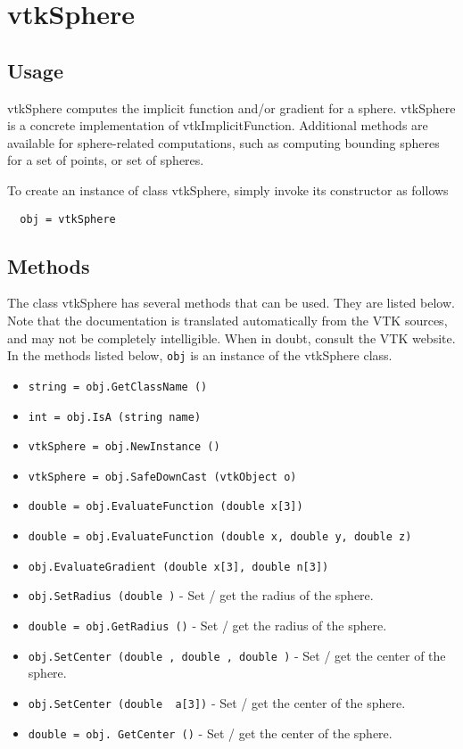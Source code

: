 \section{vtkSphere}

\subsection{Usage}

 vtkSphere computes the implicit function and/or gradient for a sphere.
 vtkSphere is a concrete implementation of vtkImplicitFunction. Additional
 methods are available for sphere-related computations, such as computing
 bounding spheres for a set of points, or set of spheres.

To create an instance of class vtkSphere, simply
invoke its constructor as follows
\begin{verbatim}
  obj = vtkSphere
\end{verbatim}
\subsection{Methods}

The class vtkSphere has several methods that can be used.
  They are listed below.
Note that the documentation is translated automatically from the VTK sources,
and may not be completely intelligible.  When in doubt, consult the VTK website.
In the methods listed below, \verb|obj| is an instance of the vtkSphere class.
\begin{itemize}
\item  \verb|string = obj.GetClassName ()|

\item  \verb|int = obj.IsA (string name)|

\item  \verb|vtkSphere = obj.NewInstance ()|

\item  \verb|vtkSphere = obj.SafeDownCast (vtkObject o)|

\item  \verb|double = obj.EvaluateFunction (double x[3])|

\item  \verb|double = obj.EvaluateFunction (double x, double y, double z)|

\item  \verb|obj.EvaluateGradient (double x[3], double n[3])|

\item  \verb|obj.SetRadius (double )| -  Set / get the radius of the sphere.

\item  \verb|double = obj.GetRadius ()| -  Set / get the radius of the sphere.

\item  \verb|obj.SetCenter (double , double , double )| -  Set / get the center of the sphere.

\item  \verb|obj.SetCenter (double  a[3])| -  Set / get the center of the sphere.

\item  \verb|double = obj. GetCenter ()| -  Set / get the center of the sphere.

\end{itemize}
